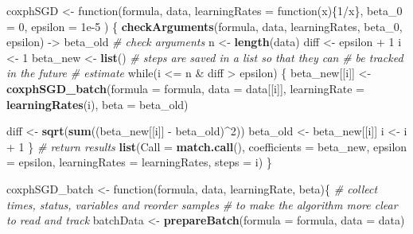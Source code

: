 \documentclass[]{article}
\newenvironment{Shaded}{\begin{snugshade}}{\end{snugshade}}
\newcommand{\KeywordTok}[1]{\textcolor[rgb]{0.13,0.29,0.53}{\textbf{{#1}}}}
\newcommand{\DataTypeTok}[1]{\textcolor[rgb]{0.13,0.29,0.53}{{#1}}}
\newcommand{\DecValTok}[1]{\textcolor[rgb]{0.00,0.00,0.81}{{#1}}}
\newcommand{\FloatTok}[1]{\textcolor[rgb]{0.00,0.00,0.81}{{#1}}}
\newcommand{\StringTok}[1]{\textcolor[rgb]{0.31,0.60,0.02}{{#1}}}
\newcommand{\CommentTok}[1]{\textcolor[rgb]{0.56,0.35,0.01}{\textit{{#1}}}}
\newcommand{\NormalTok}[1]{{#1}}
\begin{document}
\begin{Shaded}
\begin{Highlighting}[]
\NormalTok{coxphSGD <-}\StringTok{ }\NormalTok{function(formula, data, }\DataTypeTok{learningRates =} \NormalTok{function(x)\{}\DecValTok{1}\NormalTok{/x\},}
                    \DataTypeTok{beta_0 =} \DecValTok{0}\NormalTok{, }\DataTypeTok{epsilon =} \FloatTok{1e-5} \NormalTok{) \{}
  \KeywordTok{checkArguments}\NormalTok{(formula, data, learningRates,}
                  \NormalTok{beta_0, epsilon) ->}\StringTok{ }\NormalTok{beta_old }\CommentTok{# check arguments}
  \NormalTok{n <-}\StringTok{ }\KeywordTok{length}\NormalTok{(data)}
  \NormalTok{diff <-}\StringTok{ }\NormalTok{epsilon +}\StringTok{ }\DecValTok{1}
  \NormalTok{i <-}\StringTok{ }\DecValTok{1}
  \NormalTok{beta_new <-}\StringTok{ }\KeywordTok{list}\NormalTok{() }\CommentTok{# steps are saved in a list so that they can}
                     \CommentTok{# be tracked in the future}
  \CommentTok{# estimate}
  \NormalTok{while(i <=}\StringTok{ }\NormalTok{n &}\StringTok{ }\NormalTok{diff >}\StringTok{ }\NormalTok{epsilon) \{}
    \NormalTok{beta_new[[i]] <-}\StringTok{ }\KeywordTok{coxphSGD_batch}\NormalTok{(}\DataTypeTok{formula =} \NormalTok{formula, }\DataTypeTok{data =} \NormalTok{data[[i]],}
                      \DataTypeTok{learningRate =} \KeywordTok{learningRates}\NormalTok{(i), }\DataTypeTok{beta =} \NormalTok{beta_old)}
    
    \NormalTok{diff <-}\StringTok{ }\KeywordTok{sqrt}\NormalTok{(}\KeywordTok{sum}\NormalTok{((beta_new[[i]] -}\StringTok{ }\NormalTok{beta_old)^}\DecValTok{2}\NormalTok{))}
    \NormalTok{beta_old <-}\StringTok{ }\NormalTok{beta_new[[i]]}
    \NormalTok{i <-}\StringTok{ }\NormalTok{i +}\StringTok{ }\DecValTok{1}  
  \NormalTok{\}}
  \CommentTok{# return results}
  \KeywordTok{list}\NormalTok{(}\DataTypeTok{Call =} \KeywordTok{match.call}\NormalTok{(), }\DataTypeTok{coefficients =} \NormalTok{beta_new, }\DataTypeTok{epsilon =} \NormalTok{epsilon,}
       \DataTypeTok{learningRates =} \NormalTok{learningRates, }\DataTypeTok{steps =} \NormalTok{i)}
\NormalTok{\}}

\NormalTok{coxphSGD_batch <-}\StringTok{ }\NormalTok{function(formula, data, learningRate, beta)\{}
  \CommentTok{# collect times, status, variables and reorder samples }
  \CommentTok{# to make the algorithm more clear to read and track}
  \NormalTok{batchData <-}\StringTok{ }\KeywordTok{prepareBatch}\NormalTok{(}\DataTypeTok{formula =} \NormalTok{formula, }\DataTypeTok{data =} \NormalTok{data)}
  

\end{Highlighting}
\end{Shaded}
\end{document}

